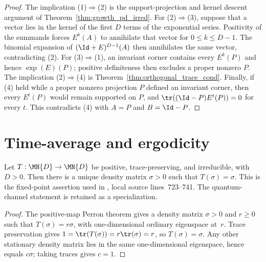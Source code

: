 \begin{proof}
    \leanok
    The implication (1)$\Rightarrow$(2) is the support-projection and kernel
    descent argument of Theorem~\ref{thm:growth_pd_irred}.
    For (2)$\Rightarrow$(3), suppose that a vector lies in the kernel of the
    first $D$ terms of the exponential series. Positivity of the summands
    forces $E^k(A)$ to annihilate that vector for $0\leq k\leq D-1$.
    The binomial expansion of $(\Id+E)^{D-1}(A)$ then annihilates the same
    vector, contradicting (2). For (3)$\Rightarrow$(1), an invariant corner contains
    every $E^k(P)$ and hence $\exp(E)(P)$; positive definiteness then excludes
    a proper nonzero $P$. The implication (2)$\Rightarrow$(4) is
    Theorem~\ref{thm:orthogonal_trace_cond}. Finally, if (4) held while a
    proper nonzero projection $P$ defined an invariant corner, then every
    $E^t(P)$ would remain supported on $P$, and
    $\tr((\Id-P)E^t(P))=0$ for every $t$. This contradicts (4) with
    $A=P$ and $B=\Id-P$.
\end{proof}

\section{Time-average and ergodicity}

\begin{theorem}
    \label{thm:channel_density_fp_irred}
    \leanok
    Let $T:\MN{D}\to\MN{D}$ be positive, trace-preserving, and irreducible,
    with $D>0$. Then there is a unique density matrix $\sigma>0$ such that
    $T(\sigma)=\sigma$. This is the fixed-point assertion used in
    \cite[Corollary~6.3]{Wolf2012Quantum}, local source lines~723--741.
    The quantum-channel statement is retained as a specialization.
\end{theorem}

\begin{proof}
    \leanok
    The positive-map Perron theorem gives a density matrix $\sigma>0$ and
    $r\geq0$ such that $T(\sigma)=r\sigma$, with one-dimensional ordinary
    eigenspace at~$r$. Trace preservation gives
    $1=\tr(T(\sigma))=r\tr(\sigma)=r$, so $T(\sigma)=\sigma$.
    Any other stationary density matrix lies in the same one-dimensional
    eigenspace, hence equals $c\sigma$; taking traces gives $c=1$.
\end{proof}


